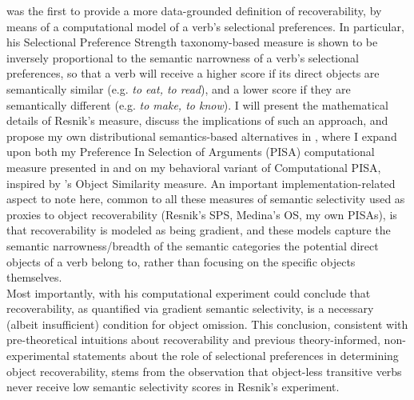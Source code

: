 \textcite{Resnik1993, Resnik1996} was the first to provide a more data-grounded definition of recoverability, by means of a computational model of a verb's selectional preferences. In particular, his Selectional Preference Strength taxonomy-based measure is shown to be inversely proportional to the semantic narrowness of a verb's selectional preferences, so that a verb will receive a higher score if its direct objects are semantically similar (e.g. \textit{to eat, to read}), and a lower score if they are semantically different (e.g. \textit{to make, to know}). I will present the mathematical details of Resnik's measure, discuss the implications of such an approach, and propose my own distributional semantics-based alternatives in , where I expand upon both my Preference In Selection of Arguments (PISA) computational measure presented in \textcite{CappelliLenciPISA} and on my behavioral variant of Computational PISA, inspired by \textcite{Medina2007}'s Object Similarity measure. An important implementation-related aspect to note here, common to all these measures of semantic selectivity used as proxies to object recoverability (Resnik's SPS, Medina's OS, my own PISAs), is that recoverability is modeled as being gradient, and these models capture the semantic narrowness/breadth of the semantic categories the potential direct objects of a verb belong to, rather than focusing on the specific objects themselves.\\
Most importantly, with his computational experiment \textcite[88]{Resnik1993} could conclude that recoverability, as quantified via gradient semantic selectivity, is a necessary (albeit insufficient) condition for object omission. This conclusion, consistent with pre-theoretical intuitions about recoverability and previous theory-informed, non-experimental statements about the role of selectional preferences in determining object recoverability, stems from the observation that object-less transitive verbs never receive low semantic selectivity scores in Resnik's experiment.


